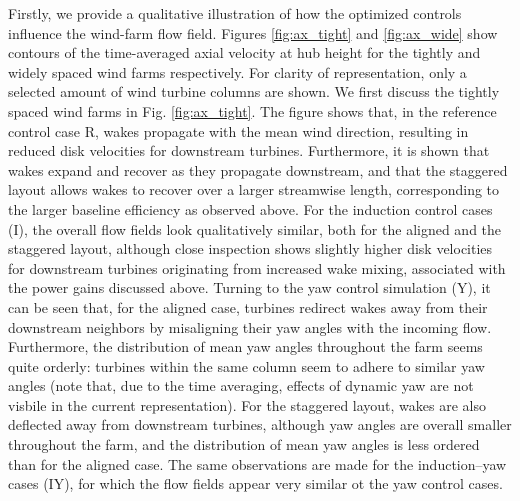 \documentclass[a4paper]{jpconf}
\begin{document}
Firstly, we provide a qualitative illustration of how the optimized controls influence the wind-farm flow field. Figures \ref{fig:ax_tight} and
\ref{fig:ax_wide} show contours of the time-averaged axial velocity at hub height for the tightly and widely spaced wind farms respectively. For
clarity of representation, only a selected amount of wind turbine columns are shown. We first discuss the tightly spaced wind farms in Fig.
\ref{fig:ax_tight}. The figure shows that, in the reference control case R, wakes propagate with the mean wind direction, resulting in reduced disk velocities for downstream turbines. Furthermore, it is shown that wakes expand and
recover as they propagate downstream, and that the staggered layout allows wakes to recover over a larger streamwise length, corresponding to the
larger baseline efficiency as observed above. For the induction control cases (I), the overall flow fields look qualitatively similar, both for the
aligned and the staggered layout, although close inspection shows slightly higher disk velocities for downstream turbines originating from increased wake mixing, associated with the power
gains discussed above. Turning to the yaw control simulation (Y), it can be seen that, for the aligned case, turbines redirect wakes away from their
downstream neighbors by misaligning their yaw angles with the incoming flow. Furthermore, the distribution of mean yaw angles throughout the farm
seems quite orderly: turbines within the same column seem to adhere to similar yaw angles (note that, due to the time averaging, effects of dynamic
yaw are not visbile in the current representation). For the staggered layout, wakes are also deflected away from downstream turbines, although yaw
angles are overall smaller throughout the farm, and the distribution of mean yaw angles is less ordered than for the aligned case. The same
observations are made for the induction--yaw cases (IY), for which the flow fields appear very similar ot the yaw control cases.
\end{document}
